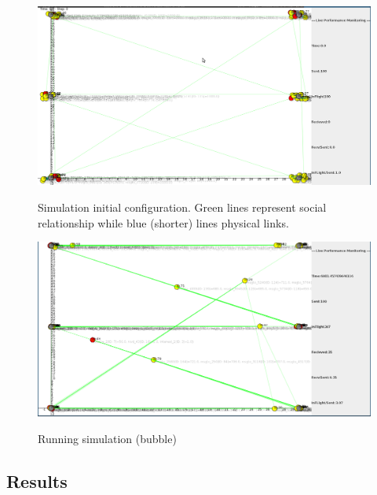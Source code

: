 \begin{figure}[h!]
	\begin{center}
    \label{fig:bubble_live_init}
    \includegraphics[scale=0.25]{img/bubble_live_init.png}
    \caption{Simulation initial configuration. Green lines represent social relationship while blue (shorter) lines physical links.}
  \end{center}
\end{figure}
\begin{figure}[h!]
	\begin{center}
    \label{fig:bubble_live}
    \includegraphics[scale=0.25]{img/bubble_live.png}
    \caption{Running simulation (bubble)}
  \end{center}
\end{figure}

\newpage
\subsection{Results}
\label{exp_results}

